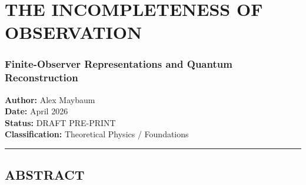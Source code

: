 \documentclass[
]{article}
\author{}
\date{}
\begin{document}
\hypertarget{the-incompleteness-of-observation}{%
\section{THE INCOMPLETENESS OF
OBSERVATION}\label{the-incompleteness-of-observation}}

\hypertarget{finite-observer-representations-and-quantum-reconstruction}{%
\subsubsection{Finite-Observer Representations and Quantum
Reconstruction}\label{finite-observer-representations-and-quantum-reconstruction}}

\textbf{Author:} Alex Maybaum\\
\textbf{Date:} April 2026\\
\textbf{Status:} DRAFT PRE-PRINT\\
\textbf{Classification:} Theoretical Physics / Foundations

\begin{center}\rule{0.5\linewidth}{0.5pt}\end{center}

\hypertarget{abstract}{%
\subsection{ABSTRACT}\label{abstract}}
\end{document}
